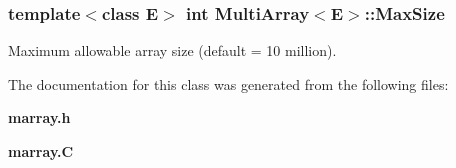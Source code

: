\subsubsection{\setlength{\rightskip}{0pt plus 5cm}template$<$class E$>$ int Multi\-Array$<$E$>$::Max\-Size}\label{classMultiArray_m0}


Maximum allowable array size (default = 10 million).



The documentation for this class was generated from the following files:\begin{CompactItemize}
\item 
{\bf marray.h}\item 
{\bf marray.C}\end{CompactItemize}
